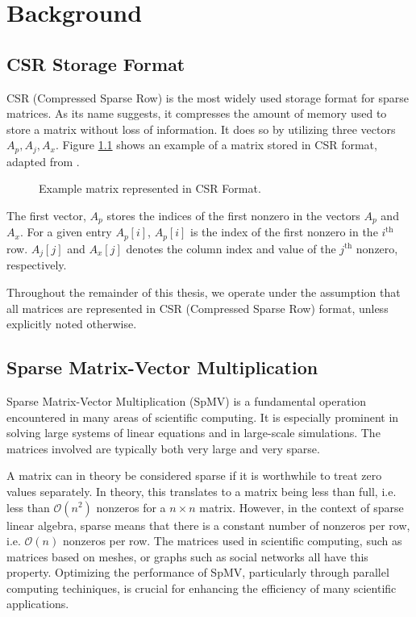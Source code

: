 \chapter{Background}

\section{CSR Storage Format}
CSR (Compressed Sparse Row) is the most widely used storage format for sparse matrices. As its name suggests, it compresses the amount of memory used to store a matrix without loss of information. It does so by utilizing three vectors \(A_{p}, A_{j}, A_{x}\). Figure \ref{fig:csrformat} shows an example of a matrix stored in CSR format, adapted from \cite{gupta2024gamgi}.

\begin{figure}[ht]
    \centering
    \caption{Example matrix represented in CSR Format.}
    \label{fig:csrformat}
\end{figure}

The first vector, \(A_{p}\) stores the indices of the first nonzero in the vectors \(A_{p}\) and \(A_{x}\). For a given entry \(A_{p}[i]\), \(A_{p}[i]\) is the index of the first nonzero in the \(i^{\text{th}}\) row. \(A_{j}[j]\) and \(A_{x}[j]\) denotes the column index and value of the \(j^{\text{th}}\) nonzero, respectively.
\medskip

Throughout the remainder of this thesis, we operate under the assumption that all matrices are represented in CSR (Compressed Sparse Row) format, unless explicitly noted otherwise.

\section{Sparse Matrix-Vector Multiplication}
Sparse Matrix-Vector Multiplication (SpMV) is a fundamental operation encountered in many areas of scientific computing. It is especially prominent in solving large systems of linear equations and in large-scale simulations. The matrices involved are typically both very large and very sparse. 

A matrix can in theory be considered sparse if it is worthwhile to treat zero values separately. In theory, this translates to a matrix being less than full, i.e. less than \( \mathcal{O}\left(n^2\right)\) nonzeros for a \(n \times  n\) matrix. However, in the context of sparse linear algebra, sparse means that there is a constant number of nonzeros per row, i.e. \(\mathcal{O}\left(n\right)\) nonzeros per row. The matrices used in scientific computing, such as matrices based on meshes, or graphs such as social networks all have this property. Optimizing the performance of SpMV, particularly through parallel computing techiniques, is crucial for enhancing the efficiency of many scientific applications.


